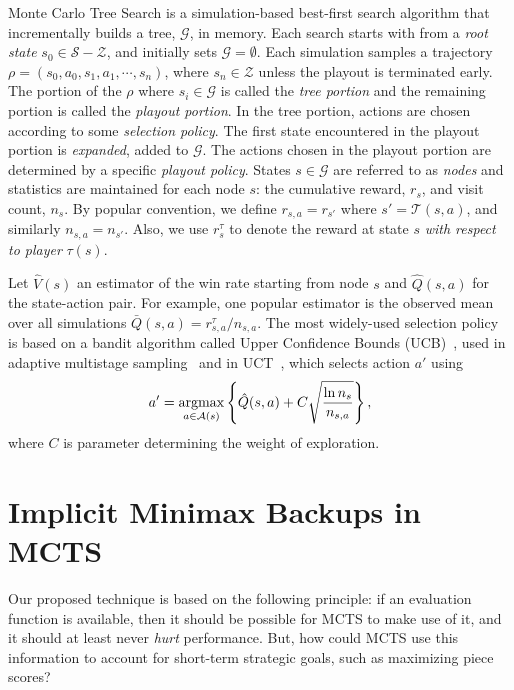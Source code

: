 \documentclass[conference]{IEEEtran}
\newcommand{\argmax}{\operatornamewithlimits{argmax}}
\newcommand{\bQ}{\bar{Q}}
\newcommand{\cA}{\mathcal{A}}
\newcommand{\cG}{\mathcal{G}}
\newcommand{\cS}{\mathcal{S}}
\newcommand{\cT}{\mathcal{T}}
\newcommand{\cZ}{\mathcal{Z}}
\newcommand{\hQ}{\hat{Q}}
\newcommand{\hV}{\hat{V}}
\begin{document}
Monte Carlo Tree Search is a simulation-based best-first search algorithm that incrementally builds a tree, $\cG$, 
in memory. 
Each search starts with from a {\it root state} $s_0 \in \cS - \cZ$, and initially sets $\cG = \emptyset$. 
Each simulation samples a trajectory $\rho = (s_0, a_0, s_1, a_1, \cdots, s_n)$, where $s_n \in \cZ$ unless the playout 
is terminated early. 
The portion of the $\rho$ where $s_i \in \cG$ is called the {\it tree portion} and the remaining portion is
called the {\it playout portion}. In the tree portion, actions are chosen according to some {\it selection policy}. 
The first state encountered in the playout portion is {\it expanded}, added to $\cG$.
The actions chosen in the playout portion are determined by a specific {\it playout policy}. 
States $s \in \cG$ are referred to as {\it nodes} and statistics are  
maintained for each node $s$: the cumulative reward, $r_s$, and visit count, $n_s$. 
By popular convention, we define $r_{s,a} = r_{s'}$ where $s' = \cT(s,a)$, and similarly $n_{s,a} = n_{s'}$. 
Also, we use $r^{\tau}_s$ to denote the reward at state $s$ {\it with respect to player} $\tau(s)$. 

Let $\hV(s)$ an estimator of the win rate starting from node $s$ and $\hQ(s,a)$ for the state-action pair. 
For example, one popular estimator is the observed mean over all simulations 
$\bQ(s,a) = r^{\tau}_{s,a} / n_{s,a}$. 
The most widely-used selection policy is based on a bandit algorithm called Upper Confidence Bounds 
(UCB)~\cite{Auer02Finite}, used in adaptive multistage sampling~\cite{Chang2005AMS} and in 
UCT~\cite{Kocsis06Bandit}, which selects action $a'$ using
\begin{equation}
\label{eq:select-ucb}
a' = \argmax_{a \in \cA(s)} \left\{ \hQ(s,a) + C \sqrt{\frac{\ln n_s}{n_{s,a}}} \right\}, 
\end{equation}
where $C$ is parameter determining the weight of exploration. 

\section{Implicit Minimax Backups in MCTS}

Our proposed technique is based on the following principle: if an evaluation function is available, then it should 
be possible for MCTS to make use of it, and it should at least never {\it hurt} performance. 
But, how could MCTS use this information to account for short-term strategic goals, such as maximizing piece scores?
\end{document}
